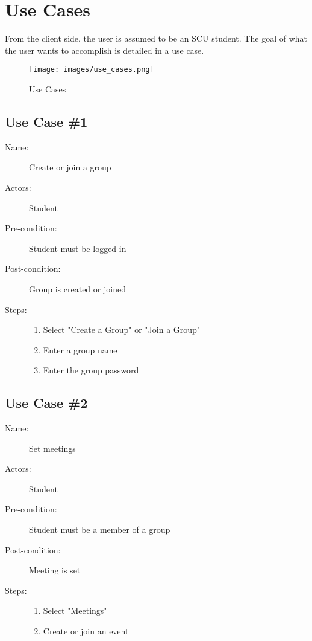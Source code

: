 \chapter{Use Cases}
From the client side, the user is assumed to be an SCU student. The goal of what the user wants to accomplish is detailed in a use case.

\begin{figure}[h]
	\centering
	\texttt{[image: images/use\_cases.png]}
	\caption{Use Cases}
	\label{fig:use cases}
\end{figure}

\section{Use Case \#1}
	\begin{description}
		\item[Name:] Create or join a group
		\item[Actors:] Student
		\item[Pre-condition:]
			Student must be logged in
		\item[Post-condition:]
			Group is created or joined
		\item[Steps:] \mbox{}
			\begin{enumerate}
				\item Select "Create a Group" or "Join a Group"
				\item Enter a group name
				\item Enter the group password
			\end{enumerate}	
	\end{description}

\section{Use Case \#2}
\begin{description}
	\item[Name:] Set meetings
	\item[Actors:] Student
	\item[Pre-condition:]
		Student must be a member of a group
	\item[Post-condition:]
		Meeting is set
	\item[Steps:] \mbox{}
	\begin{enumerate}
		\item Select "Meetings"
		\item Create or join an event
	\end{enumerate}	
\end{description}

